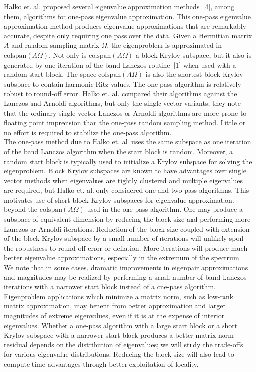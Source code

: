 \documentclass{report}
\begin{document}
Halko et. al. proposed several eigenvalue approximation
methods~[4], among them, algorithms for
one-pass eigenvalue approximation. This one-pass eigenvalue
approximation method produces eigenvalue approximations that are
remarkably accurate, despite only requiring one pass over the data.
Given a Hermitian matrix $A$ and random sampling matrix $\Omega$, the
eigenproblem is approximated in $\mathrm{colspan}(A \Omega)$. Not
only is $\mathrm{colspan}(A \Omega)$ a block Krylov subspace, but it
also is generated by one iteration of the band Lanczos
routine~[1] when used with a random start block.
The space $\mathrm{colspan}(A \Omega)$ is also the shortest block
Krylov subspace to contain harmonic Ritz values. The one-pass
algorithm is relatively robust to round-off error. Halko
et. al. compared their algorithms against the Lanczos and Arnoldi
algorithms, but only the single vector variants; they note that the
ordinary single-vector Lanczos or Arnoldi algorithms are more prone to
floating point imprecision than the one-pass random sampling method.
Little or no effort is required to stabilize the one-pass algorithm. \\

The one-pass
method due to Halko et. al. uses the same subspace as one iteration of
the band Lanczos algorithm when the start block is random. Moreover,
a random start block is typically used to initialize a Krylov subspace
for solving the eigenproblem. Block Krylov subspaces are known to
have advantages over single vector methods when eigenvalues are
tightly clustered and multiple eigenvalues are
required, but Halko et. al. only
considered one and two pass algorithms. This motivates use of short
block Krylov subspaces for eigenvalue approximation, beyond the
$\mathrm{colspan}(A \Omega)$ used in the one pass algorithm.
One may produce a subspace of equivalent dimension by reducing the
block size and performing more Lanczos or Arnoldi iterations.
Reduction of the block size coupled with extension of the block Krylov
subspace by a small number of iterations will unlikely spoil the
robustness to round-off error or deflation. More iterations will
produce much better eigenvalue approximations, especially in the
extremum of the spectrum. We note that in some cases, dramatic
improvements in eigenpair approximations and magnitudes may be
realized by performing a small number of band Lanczos iterations with
a narrower start block instead of a one-pass algorithm. Eigenproblem
applications which minimize a matrix norm, such
as low-rank matrix approximation, may benefit from better
approximation and larger magnitudes of extreme eigenvalues, even if it
is at the expense of interior eigenvalues. Whether a one-pass
algorithm with a large start block or a short Krylov subspace with a
narrower start block produces a better matrix norm residual depends
on the distribution of eigenvalues; we will study the trade-offs for
various eigenvalue distributions. Reducing the block size will also
lead to compute time advantages through better exploitation of
locality. \\
\end{document}
